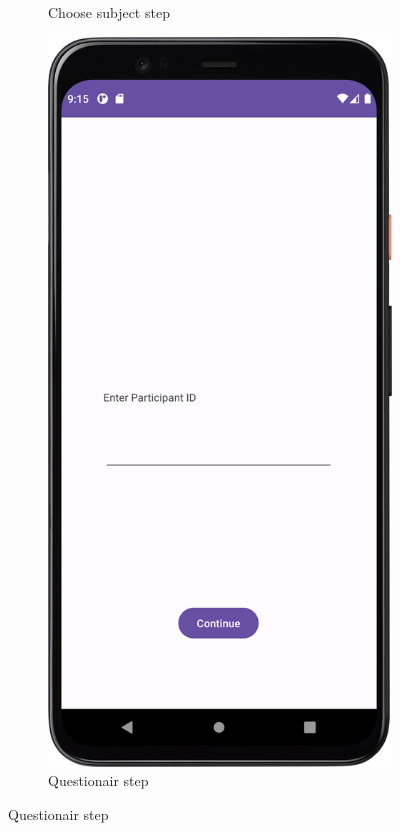 \begin{figure}[htbp]
\begin{subfigure}[b]{0.25\textwidth}
        \caption{Choose subject step}
        \label{subfig:chooseTestSubject2}
    \end{subfigure}
    \hspace{1cm}
    \begin{subfigure}[b]{0.25\textwidth}
        \centering
        \includegraphics[width=\textwidth]{content/06_demonstration_of_the_artifact/Screenshot_ParticipantSelectionScreen.png}
        \caption{Questionair step}
        \label{subfig:Questionair2}
    \end{subfigure}


\end{figure}

